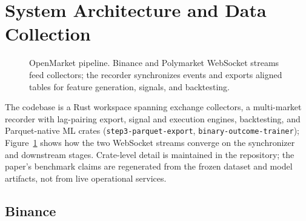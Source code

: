 \section{System Architecture and Data Collection}
\label{sec:architecture}

\begin{figure}[t]
  \centering
  \caption{OpenMarket pipeline. Binance and Polymarket WebSocket streams feed
    collectors; the recorder synchronizes events and exports aligned tables for
    feature generation, signals, and backtesting.}
  \label{fig:architecture}
\end{figure}

The codebase is a Rust workspace spanning exchange collectors, a multi-market
recorder with lag-pairing export, signal and execution engines, backtesting, and
Parquet-native ML crates (\texttt{step3-parquet-export},
\texttt{binary-outcome-trainer}); Figure~\ref{fig:architecture} shows how the
two WebSocket streams converge on the synchronizer and downstream stages.
Crate-level detail is maintained in the repository; the paper's benchmark
claims are regenerated from the frozen dataset and model artifacts, not from
live operational services.

\subsection{Binance}
\label{sec:data-binance}

